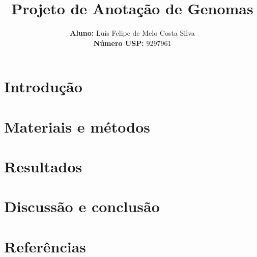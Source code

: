 \documentclass{article}
\title{\textbf{Projeto de Anotação de Genomas}}
\author{
    \textbf{Aluno:} Luís Felipe de Melo Costa Silva  \\
    \textbf{Número USP:} 9297961
    }
\date{}
\begin{document}
\maketitle

\section{Introdução}
\section{Materiais e métodos}
\section{Resultados}
\section{Discussão e conclusão}
\section{Referências}
\end{document}
